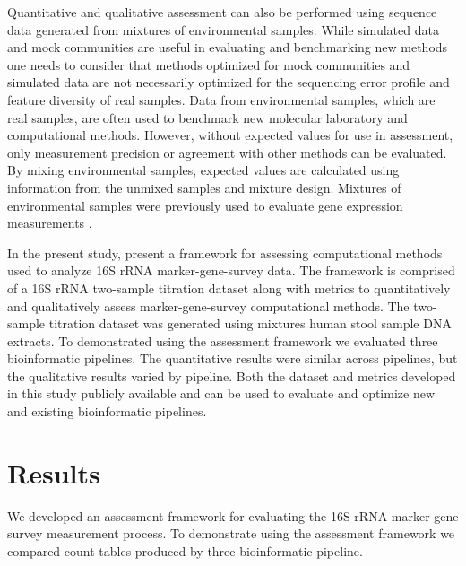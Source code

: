 \documentclass{bmcart}
\begin{document}
Quantitative and qualitative assessment can also be performed using
sequence data generated from mixtures of environmental samples. While
simulated data and mock communities are useful in evaluating and
benchmarking new methods one needs to consider that methods optimized
for mock communities and simulated data are not necessarily optimized
for the sequencing error profile and feature diversity of real samples.
Data from environmental samples, which are real samples, are often used
to benchmark new molecular laboratory and computational methods.
However, without expected values for use in assessment, only measurement
precision or agreement with other methods can be evaluated. By mixing
environmental samples, expected values are calculated using information
from the unmixed samples and mixture design. Mixtures of environmental
samples were previously used to evaluate gene expression measurements
\cite{parsons2015using, pine2011adaptable, thompson2005use}.


In the present study, present a framework for assessing computational methods used to
analyze 16S rRNA marker-gene-survey data. The framework is comprised of a 16S rRNA
two-sample titration dataset along with metrics to quantitatively and qualitatively assess
marker-gene-survey computational methods.
The two-sample titration dataset was generated using mixtures human stool sample DNA extracts.
To demonstrated using the assessment framework we evaluated three bioinformatic pipelines.
The quantitative results were similar across pipelines, but the qualitative results varied by pipeline.
Both the dataset and metrics developed in this study publicly available and can be used to evaluate and optimize
new and existing bioinformatic pipelines.


\section*{Results}
We developed an assessment framework for evaluating the 16S rRNA marker-gene survey measurement process.
To demonstrate using the assessment framework we compared count tables produced by three bioinformatic pipeline.
\end{document}
